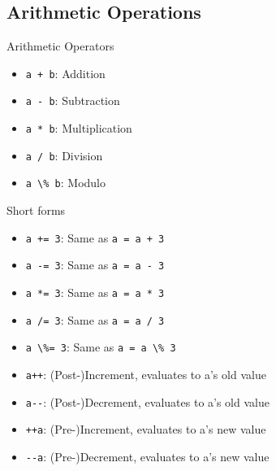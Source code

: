 \documentclass[english,compress]{beamer}
\begin{document}
\subsection{Arithmetic Operations}
\begin{frame}{Arithmetic Operators}
	\begin{itemize}
		\item \lstinline|a + b|: Addition
		\item \lstinline|a - b|: Subtraction
		\item \lstinline|a * b|: Multiplication
		\item \lstinline|a / b|: Division
		\item \lstinline|a \% b|: Modulo
	\end{itemize}
\end{frame}

\begin{frame}{Short forms}
	\begin{itemize}
		\item \lstinline|a += 3|: Same as \lstinline|a = a + 3|
		\item \lstinline|a -= 3|: Same as \lstinline|a = a - 3|
		\item \lstinline|a *= 3|: Same as \lstinline|a = a * 3|
		\item \lstinline|a /= 3|: Same as \lstinline|a = a / 3|
		\item \lstinline|a \%= 3|: Same as \lstinline|a = a \% 3|
		\item \lstinline|a++|: (Post-)Increment, evaluates to a's old value
		\item \lstinline|a--|: (Post-)Decrement, evaluates to a's old value
		\item \lstinline|++a|: (Pre-)Increment, evaluates to a's new value
		\item \lstinline|--a|: (Pre-)Decrement, evaluates to a's new value
	\end{itemize}
\end{frame}
\end{document}
